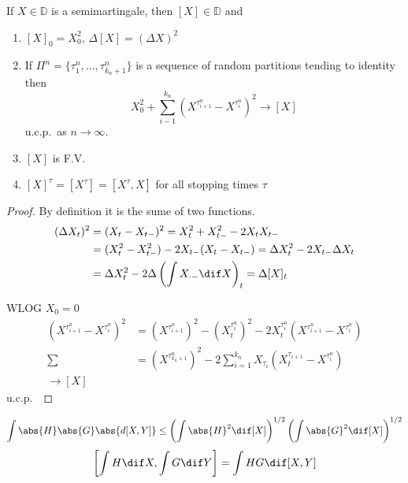 \documentclass{scrreprt}
\theoremstyle{remark}
\newcommand{\cadspace}{\mathbb D}
\begin{document}
\begin{theorem}
	If $X \in \cadspace$ is a semimartingale, then $[X] \in \cadspace$ and
	\begin{enumerate}
		\item $[X]_0 = X_0^2$, $\Delta [X] = (\Delta X)^2$
		\item If $\Pi^n = \{\tau_1^n, \ldots, \tau_{k_n + 1}^n\}$ is a sequence of random partitions tending to identity then
			\begin{equation}
				X_0^2 + \sum_{i-1}^{k_n} (X^{\tau^n_{i+1}} - X^{\tau^n_i})^2 \to [X]
			\end{equation}
			u.c.p.\ as $n \to \infty$.
		\item $[X]$ is F.V.
		\item $[X]^{\tau} = [X^{\tau}] = [X^{\tau}, X]$ for all stopping times $\tau$
	\end{enumerate}
\end{theorem}
\begin{proof}
	By definition it is the sume of two \cadlag{} functions. 
	\begin{align}
		(\Delta X_t)^2
		&= (X_t - X_{t-})^2
		= X_t^2 + X_{t-}^2 - 2X_t X_{t-} \\
		&= (X_t^2 - X_{t-}^2) - 2X_{t-}(X_t - X_{t-})
		= \Delta X^2_t - 2X_{t-} \Delta X_t \\
		&= \Delta X_t^2 - 2 \Delta \left(\int X_{\cdot -} \dif X\right)_t 
		= \Delta[X]_t
	\end{align}

	WLOG $X_0 = 0$
	\begin{align}
		(X^{\tau^n_{i+1}} - X^{\tau^n_i})^2
		&= (X^{\tau^n_{i+1}})^2 - (X_t^{\tau^n_i})^2 - 2X_t^{\tau^n_i}(X^{\tau^n_{i+1}} - X^{\tau^n_i}) \\
		\sum &= (X^{\tau^n_{k_n + 1}})^2 - 2 \sum_{i=1}^{k_n} X_{\tau_i}(X_t^{\tau_{i+1}} - X^{\tau^n_i}) \\
		\to [X]
	\end{align}
	u.c.p.\
\end{proof}

\begin{prop}
	\begin{equation}
		\int \abs{H} \abs{G} \abs{d[X, Y]} 
		\leq \left(\int \abs{H}^2 \dif [X]\right)^{1/2}
		\left( \int \abs{G}^2 \dif [X]\right)^{1/2}
	\end{equation}
	\begin{equation}
		\left[\int H \dif X, \int G \dif Y\right] = \int HG \dif [X, Y]
	\end{equation}
\end{prop}
\end{document}
